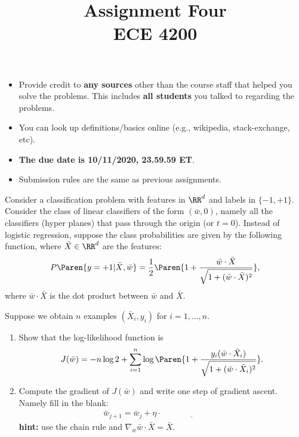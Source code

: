 \documentclass[11pt]{article}
\title{Assignment Four\\ ECE 4200}
\newenvironment{problem}[2][Problem]{\begin{trivlist}
\item[\hskip \labelsep {\bfseries #1}\hskip \labelsep {\bfseries #2.}]}{\end{trivlist}}
\begin{document}
\maketitle 

\begin{itemize}
\item
Provide credit to \textbf{any sources} other than the course staff that helped you solve the problems. This includes \textbf{all students} you talked to regarding the problems. 	
\item
You can look up definitions/basics online (e.g., wikipedia, stack-exchange, etc).
\item
{\bf The due date is 10/11/2020, 23.59.59 ET}. 
\item
Submission rules are the same as previous assignments.
\end{itemize}



\begin{problem}{1 (10 points) Different class conditional probabilities}
Consider a classification problem with features in $\RR^d$ and labels in $\{-1, +1\}$. Consider the class of linear classifiers of the form $(\bar w, 0)$, namely all the classifiers (hyper planes) that pass through the origin (or $t=0$). Instead of logistic regression, suppose the class probabilities are given by the following function, where $\bar X\in\RR^d$ are the features:
\begin{align}
P\Paren{y=+1|\bar X, \bar w} = \frac12\Paren{1+\frac{\bar w\cdot \bar X}{\sqrt{1+(\bar w\cdot \bar X)^2}}}, 
\end{align}
where $\bar w\cdot \bar X$ is the dot product between $\bar w$ and  $\bar X$. 

Suppose we obtain $n$ examples $(\bar X_i, y_i)$ for $i=1,\ldots, n$. 
\begin{enumerate}
\item 
Show that the log-likelihood function is
\begin{align}
J(\bar w) = -n\log 2 + \sum_{i=1}^{n} \log \Paren{1+ \frac{y_i (\bar w\cdot \bar X_i)}{\sqrt{1+(\bar w\cdot \bar X_i)^2}}}.
\end{align}
\item
Compute the gradient of $J(\bar w)$ and write one step of gradient ascent. Namely fill in the blank:
\begin{align}
\bar w_{j+1} = \bar w_j + \eta\cdot \underline{\hspace{3cm}}\nonumber
\end{align}
\textbf{hint:} use the chain rule and $\nabla_{\bar w} \bar w\cdot \bar X = \bar X$. 
\end{enumerate}
\end{problem}
\end{document}
